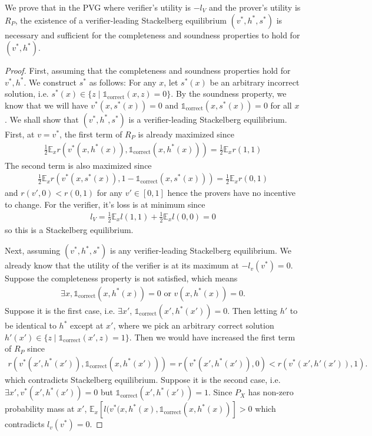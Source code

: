 \documentclass{article}
\newcommand{\indcor}[1]{\mathds{1}_{\text{correct}}\left({#1}\right)}
\begin{document}
We prove that in the PVG where verifier's utility is $-l_V$ and the prover's utility is $R_P$, the existence of a verifier-leading Stackelberg equilibrium $(v^*, h^*, s^*)$ is necessary and sufficient for the completeness and soundness properties to hold for $(v^*, h^*)$.

\begin{proof}
    First, assuming that the completeness and soundness properties hold for $v^*, h^*$. We construct $s^*$ as follows: For any $x$, let $s^*(x)$ be an arbitrary incorrect solution, i.e. $s^*(x) \in \{z \mid \indcor{x, z}=0\}$. By the soundness property, we know that we will have $v^*(x, s^*(x)) =0$ and $\indcor{x, s^*(x)}=0$ for all $x$. We shall show that $(v^*, h^*, s^*)$ is a verifier-leading Stackelberg equilibrium.
    First, at $v = v^*$, the first term of $R_P$ is already maximized since 
    \begin{align*}
        \frac{1}{2}\mathbb{E}_x{r(v^*(x, h^*(x)), \indcor{x, h^*(x)})} = \frac{1}{2}\mathbb{E}_x{r(1, 1)}
    \end{align*} The second term is also maximized since 
    \begin{align*}
        \frac{1}{2}\mathbb{E}_x{r(v^*(x, s^*(x)), 1-\indcor{x, s^*(x)})} = \frac{1}{2}\mathbb{E}_x {r(0, 1)}
    \end{align*} and $r(v', 0) < r(0, 1)$ for any $v' \in [0, 1]$ hence the provers have no incentive to change. For the verifier, it's loss is at minimum since
    \begin{align*}
        l_V = \frac{1}{2}\mathbb{E}_x{l(1, 1)} + \frac{1}{2}\mathbb{E}_x{l(0, 0)} = 0
    \end{align*} so this is a Stackelberg equilibrium.

    Next, assuming $(v^*, h^*, s^*)$ is any verifier-leading Stackelberg equilibrium. We already know that the utility of the verifier is at its maximum at $-l_v(v^*) =0$. Suppose the completeness property is not satisfied, which means 
    \begin{align*}
        \exists x, \indcor{x, h^*(x)}=0 \text{ or } v(x, h^*(x)) = 0.
    \end{align*} Suppose it is the first case, i.e. $\exists x'$, $\indcor{x', h^*(x')}=0$. Then letting $h'$ to be identical to $h^*$ except at $x'$, where we pick an arbitrary correct solution $h'(x') \in \{z \mid \indcor{x', z}=1\}$. Then we would have increased the first term of $R_P$ since
    \begin{align*}
        r(v^*(x', h^*(x')), \indcor{x, h^*(x')}) = r(v^*(x', h^*(x')), 0) < r(v^*(x', h'(x')),1).
    \end{align*} which contradicts Stackelberg equilibrium.
    Suppose it is the second case, i.e. $\exists x', v^*(x', h^*(x')) = 0$ but $\indcor{x', h^*(x')} = 1$. Since $P_X$ has non-zero probability mass at $x'$, $\mathbb{E}_x[l(v^*(x, h^*(x), \indcor{x, h^*(x)}]>0$ which contradicts $l_v(v^*)=0$.


\end{proof}
\end{document}
